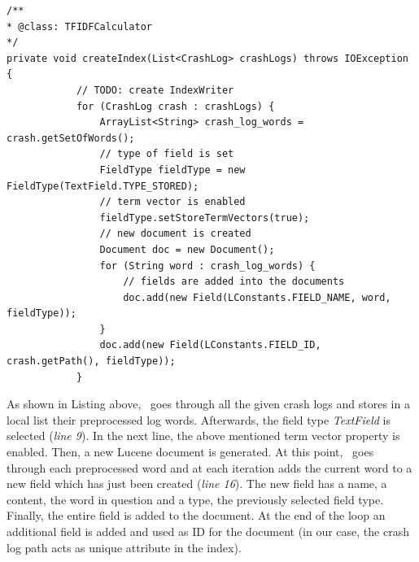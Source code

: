 \begin{lstlisting}[caption=\TFIDF\ describing the Lucene indexing process,label={lst: indexing}]
/**
* @class: TFIDFCalculator
*/
private void createIndex(List<CrashLog> crashLogs) throws IOException {
			// TODO: create IndexWriter
            for (CrashLog crash : crashLogs) {
                ArrayList<String> crash_log_words = crash.getSetOfWords();
                // type of field is set
                FieldType fieldType = new FieldType(TextField.TYPE_STORED); 
                // term vector is enabled
                fieldType.setStoreTermVectors(true); 
                // new document is created
                Document doc = new Document(); 
                for (String word : crash_log_words) {
                    // fields are added into the documents
                    doc.add(new Field(LConstants.FIELD_NAME, word, fieldType)); 
                }
                doc.add(new Field(LConstants.FIELD_ID, crash.getPath(), fieldType));
            }
\end{lstlisting} 
As shown in Listing above, \toolname\ goes through all the given crash logs and stores in a local list their preprocessed log words. 
Afterwards, the field type \textit{TextField} is selected (\textit{line 9}). 
In the next line, the above mentioned term vector property is enabled. 
Then, a new Lucene document is generated. 
At this point, \toolname\ goes through each preprocessed word and at each iteration adds the current word to a new field which has just been created (\textit{line 16}). 
The new field has a name, a content, \ie the word in question and a type, \ie the previously selected field type. 
Finally, the entire field is added to the document. 
At the end of the loop an additional field is added and used as ID for the document (in our case, the crash log path acts as unique attribute in the index). 

